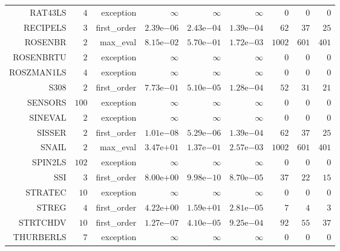 \begin{longtable}{rrrrrrrrr}
RAT43LS & \(     4\) & exception & \(\infty\) & \(\infty\) & \(\infty\) & \(     0\) & \(     0\) & \(     0\) \\
RECIPELS & \(     3\) & first\_order & \( 2.39\)e\(-06\) & \( 2.43\)e\(-04\) & \( 1.39\)e\(-04\) & \(    62\) & \(    37\) & \(    25\) \\
ROSENBR & \(     2\) & max\_eval & \( 8.15\)e\(-02\) & \( 5.70\)e\(-01\) & \( 1.72\)e\(-03\) & \(  1002\) & \(   601\) & \(   401\) \\
ROSENBRTU & \(     2\) & exception & \(\infty\) & \(\infty\) & \(\infty\) & \(     0\) & \(     0\) & \(     0\) \\
ROSZMAN1LS & \(     4\) & exception & \(\infty\) & \(\infty\) & \(\infty\) & \(     0\) & \(     0\) & \(     0\) \\
S308 & \(     2\) & first\_order & \( 7.73\)e\(-01\) & \( 5.10\)e\(-05\) & \( 1.28\)e\(-04\) & \(    52\) & \(    31\) & \(    21\) \\
SENSORS & \(   100\) & exception & \(\infty\) & \(\infty\) & \(\infty\) & \(     0\) & \(     0\) & \(     0\) \\
SINEVAL & \(     2\) & exception & \(\infty\) & \(\infty\) & \(\infty\) & \(     0\) & \(     0\) & \(     0\) \\
SISSER & \(     2\) & first\_order & \( 1.01\)e\(-08\) & \( 5.29\)e\(-06\) & \( 1.39\)e\(-04\) & \(    62\) & \(    37\) & \(    25\) \\
SNAIL & \(     2\) & max\_eval & \( 3.47\)e\(+01\) & \( 1.37\)e\(-01\) & \( 2.57\)e\(-03\) & \(  1002\) & \(   601\) & \(   401\) \\
SPIN2LS & \(   102\) & exception & \(\infty\) & \(\infty\) & \(\infty\) & \(     0\) & \(     0\) & \(     0\) \\
SSI & \(     3\) & first\_order & \( 8.00\)e\(+00\) & \( 9.98\)e\(-10\) & \( 8.70\)e\(-05\) & \(    37\) & \(    22\) & \(    15\) \\
STRATEC & \(    10\) & exception & \(\infty\) & \(\infty\) & \(\infty\) & \(     0\) & \(     0\) & \(     0\) \\
STREG & \(     4\) & first\_order & \( 4.22\)e\(+00\) & \( 1.59\)e\(+01\) & \( 2.81\)e\(-05\) & \(     7\) & \(     4\) & \(     3\) \\
STRTCHDV & \(    10\) & first\_order & \( 1.27\)e\(-07\) & \( 4.10\)e\(-05\) & \( 9.25\)e\(-04\) & \(    92\) & \(    55\) & \(    37\) \\
THURBERLS & \(     7\) & exception & \(\infty\) & \(\infty\) & \(\infty\) & \(     0\) & \(     0\) & \(     0\) \\

\end{longtable}
